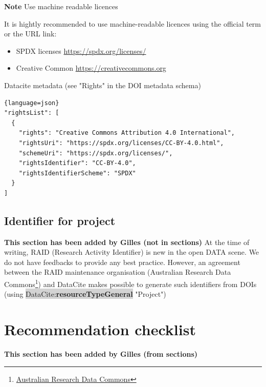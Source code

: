 \documentclass[11pt,a4paper]{ivoa}
\newcommand{\dataciteterm}[1]{\colorbox{lightgray}{DataCite:\textbf{#1}}}
\newcommand{\important}[1]{
	\begin{bigdescription}
		\item \color{ivoacolor}\textbf{Note} #1
	\end{bigdescription}
}
\begin{document}
\important{Use machine readable licences}

It is hightly recommended to use machine-readable licences using the official term or the URL link:

\begin{itemize}
\item SPDX licenses \url{https://spdx.org/licenses/}
\item Creative Common \url{https://creativecommons.org}
\end{itemize}

Datacite metadata (see "Rights" in the DOI metadata schema)

\begin{lstlisting}{language=json}
"rightsList": [
  {
    "rights": "Creative Commons Attribution 4.0 International",
    "rightsUri": "https://spdx.org/licenses/CC-BY-4.0.html",
    "schemeUri": "https://spdx.org/licenses/",
    "rightsIdentifier": "CC-BY-4.0",
    "rightsIdentifierScheme": "SPDX"
  }
]
\end{lstlisting}

\subsection{Identifier for project}
\textbf{\color{red}This section has been added by Gilles (not in sections)}
At the time of writing, RAID (Research Activity Identifier) is new in the open DATA scene. We do not have feedbacks to provide any best practice. However, an agreement between the RAID maintenance organisation (Australian Research Data Commons\footnote{\url{ Australian Research Data Commons}}) and DataCite makes possible to generate such identifiers from DOIs (using \dataciteterm{resourceTypeGeneral} "Project")


\section{Recommendation checklist}
\textbf{\color{red}This section has been added by Gilles (from sections)}
\end{document}
